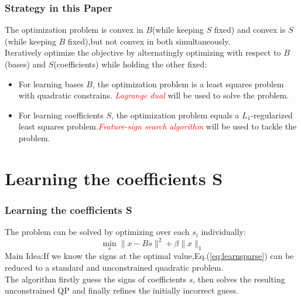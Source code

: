 \documentclass{beamer}
\begin{document}
\begin{frame}\frametitle{Strategy in this Paper}
The optimization problem is convex in $B$(while keeping $S$ fixed) and convex is $S$(while keeping $B$ fixed),but not convex in both simultaneously.\\
Iteratively optimize the objective by alternatingly optimizing with respect to $B$(bases) and $S$(coefficients) while holding the other fixed:\\
\begin{itemize}
\item For learning bases $B$, the optimization problem is a least squares problem with quadratic constrains. \emph{\textcolor{red}{Lagrange dual}} will be used to solve the problem.
\item For learning coefficients $S$, the optimization problem equals a $L_1$-regularized least squares problem.\emph{\textcolor{red}{Feature-sign search algorithm}} will be used to tackle the problem.
\end{itemize}
\end{frame}

\section{Learning the coefficients S}
\begin{frame}\frametitle{Learning the coefficients S}
The problem can be solved by optimizing over each $s_i$ individually:
\begin{equation}\label{eq:learnsparse}
\min_s \|x-Bs\|^2+\beta\|x\|_1
\end{equation}
Main Idea:If we know the signs at the optimal value,Eq.(\ref{eq:learnsparse}) can be reduced to a standard and unconstrained quadratic problem.\\
\medskip 
The algorithm firstly guess the signs of coefficients $s$, then solves the resulting unconstrained QP and finally refines the initially incorrect guess.
\end{frame}
\end{document}
